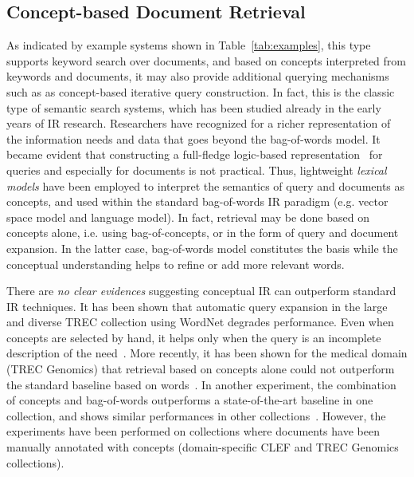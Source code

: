 \subsection{Concept-based Document Retrieval} 
As indicated by example systems shown in Table~\ref{tab:examples}, this type supports keyword search over documents, and based on concepts interpreted from keywords and documents, it may also provide additional querying mechanisms such as as concept-based iterative query construction. In fact, this is the classic type of semantic search systems, which has been studied already in the early years of IR research. Researchers have recognized for a richer representation of the information needs and data that goes beyond the bag-of-words model. It became evident that constructing a full-fledge logic-based representation~\cite{DBLP:conf/sigir/Rijsbergen89} for queries and especially for documents is not practical. Thus, lightweight \emph{lexical models} have been employed to interpret the semantics of query and documents as concepts, and used within the standard bag-of-words IR paradigm (e.g. vector space model and language model). In fact, retrieval may be done based on concepts alone, i.e. using bag-of-concepts, or in the form of query and document expansion. In the latter case, bag-of-words model constitutes the basis while the conceptual understanding helps to refine or add more relevant words. 

There are \emph{no clear evidences} suggesting conceptual IR can outperform standard IR techniques. It has been shown that automatic query expansion in the large and diverse TREC collection using WordNet degrades performance. Even when concepts are selected by hand, it helps only when the query is an incomplete description of the need~\cite{DBLP:conf/sigir/Voorhees94}. More recently, it has been shown for the medical domain (TREC Genomics) that retrieval based on concepts alone could not outperform the standard baseline based on words~\cite{DBLP:conf/trec/TrieschniggKS06,DBLP:conf/trec/ZhouYTS06}. In another experiment, the combination of concepts and bag-of-words 
outperforms a state-of-the-art baseline in one collection, and shows similar performances in other collections~\cite{DBLP:journals/ipm/MeijTRK10}. However, the experiments have been performed on 
collections where documents have been manually annotated with concepts (domain-specific CLEF and TREC Genomics collections). 

